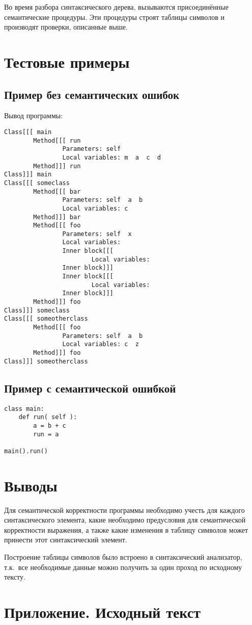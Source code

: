 \documentclass[a4paper,12pt,notitlepage,pdftex]{scrreprt}
\begin{document}
    Во время разбора синтаксического дерева, вызываются присоединённые семантические процедуры.
    Эти процедуры строят таблицы символов и производят проверки, описанные выше.
\chapter{Тестовые примеры}
\label{chap:fourth}
    \section{Пример без семантических ошибок}
    \label{sec:ex1}
        
        Вывод программы:
        \begin{verbatim}
Class[[[ main
        Method[[[ run
                Parameters: self
                Local variables: m  a  c  d
        Method]]] run
Class]]] main
Class[[[ someclass
        Method[[[ bar
                Parameters: self  a  b
                Local variables: c
        Method]]] bar
        Method[[[ foo
                Parameters: self  x
                Local variables:
                Inner block[[[
                        Local variables:
                Inner block]]]
                Inner block[[[
                        Local variables:
                Inner block]]]
        Method]]] foo
Class]]] someclass
Class[[[ someotherclass
        Method[[[ foo
                Parameters: self  a  b
                Local variables: c  z
        Method]]] foo
Class]]] someotherclass

        \end{verbatim}

    \section{Пример с семантической ошибкой}
    \label{sec:ex2}
        \begin{lstlisting}
class main:
    def run( self ):
        a = b + c
        run = a

main().run()
        \end{lstlisting}
\chapter{Выводы}
\label{chap:concl}
    Для семантической корректности программы необходимо учесть для каждого синтаксического элемента, какие необходимо
    предусловия для семантической корректности выражения, а также какие изменения в таблицу символов может принести
    этот синтаксический элемент.

    Построение таблицы символов было встроено в синтаксический анализатор, т.к.\ все необходимые данные можно получить
    за один проход по исходному тексту.
\chapter*{Приложение. Исходный текст}
    \lstset{language=C++,basicstyle=\scriptsize}
    
\end{document}
